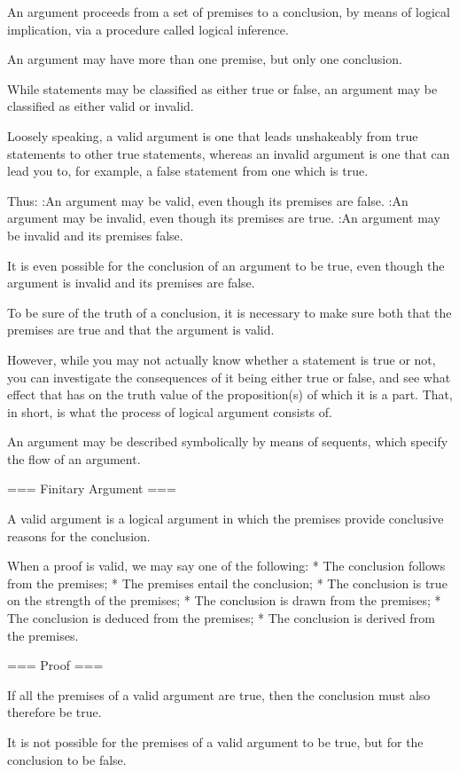 An argument proceeds from a set of premises to a conclusion, by means of logical implication, via a procedure called logical inference.


An argument may have more than one premise, but only one conclusion.


While statements may be classified as either true or false, an argument may be classified as either valid or invalid.


Loosely speaking, a valid argument is one that leads unshakeably from true statements to other true statements, whereas an invalid argument is one that can lead you to, for example, a false statement from one which is true.


Thus:
:An argument may be valid, even though its premises are false.
:An argument may be invalid, even though its premises are true.
:An argument may be invalid and its premises false.

It is even possible for the conclusion of an argument to be true, even though the argument is invalid and its premises are false.


To be sure of the truth of a conclusion, it is necessary to make sure both that the premises are true and that the argument is valid.


However, while you may not actually know whether a statement is true or not, you can investigate the consequences of it being either true or false, and see what effect that has on the truth value of the proposition(s) of which it is a part. That, in short, is what the process of logical argument consists of.


An argument may be described symbolically by means of sequents, which specify the flow of an argument.


=== Finitary Argument ===

A valid argument is a logical argument in which the premises provide conclusive reasons for the conclusion.


When a proof is valid, we may say one of the following:
* The conclusion follows from the premises;
* The premises entail the conclusion;
* The conclusion is true on the strength of the premises;
* The conclusion is drawn from the premises;
* The conclusion is deduced from the premises;
* The conclusion is derived from the premises.


=== Proof ===

If all the premises of a valid argument are true, then the conclusion must also therefore be true.

It is not possible for the premises of a valid argument to be true, but for the conclusion to be false.


